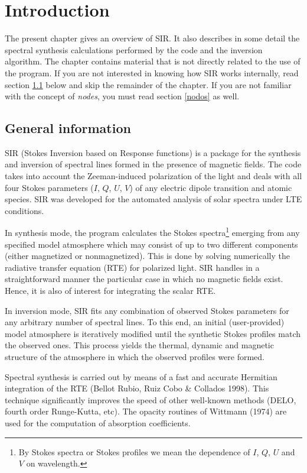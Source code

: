 \thispagestyle{empty}
\clearpage

\tableofcontents

\chapter{Introduction}

The present chapter gives an overview of SIR. It also describes in 
some detail the spectral synthesis calculations performed by the code 
and the inversion algorithm. The chapter contains material that
is not directly related to the use of the program. If you are not 
interested in knowing how SIR works internally, read section \ref{general}
below and skip the remainder of the chapter. If you are not familiar with
the concept of {\em nodes}, you must read section \ref{nodos} as well.


\section{General information}
\label{general}
SIR (Stokes Inversion based on Response functions) is a package for the
synthesis and inversion of spectral lines formed in the presence of
magnetic fields. The code takes into account the Zeeman-induced
polarization of the light and deals with all four Stokes parameters
($I$, $Q$, $U$, $V$) of any electric dipole transition and atomic
species. SIR was developed for the automated analysis of solar spectra
under LTE conditions.

In synthesis mode, the program calculates the Stokes
spectra\footnote{By Stokes spectra or Stokes profiles we mean the
dependence of $I$, $Q$, $U$ and $V$ on wavelength.} emerging from any
specified model atmosphere which may consist of up to two different
components (either magnetized or nonmagnetized). This is done by
solving numerically the radiative transfer equation (RTE) for polarized
light. SIR handles in a straightforward manner the particular case in
which no magnetic fields exist. Hence, it is also of interest for
integrating the scalar RTE.

In inversion mode, SIR fits any combination of observed Stokes
parameters for any arbitrary number of spectral lines. To this end, an
initial (user-provided) model atmosphere is iteratively modified until
the synthetic Stokes profiles match the observed ones. This process
yields the thermal, dynamic and magnetic structure of the atmosphere in
which the observed profiles were formed.

Spectral synthesis is carried out by means of a fast and accurate
Hermitian integration of the RTE (Bellot Rubio, Ruiz Cobo \& Collados
1998). This technique significantly improves the speed of other
well-known methods (DELO, fourth order Runge-Kutta, etc).  The 
opacity routines of Wittmann (1974) are used for the computation 
of absorption coefficients.

